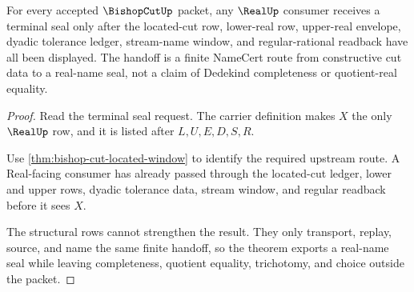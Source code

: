 \begin{theorem}
\label{thm:bishop-cut-real-handoff}
For every accepted $\BishopCutUp$ packet, any $\RealUp$ consumer receives a terminal seal only after the located-cut row, lower-real row, upper-real envelope, dyadic tolerance ledger, stream-name window, and regular-rational readback have all been displayed. The handoff is a finite NameCert route from constructive cut data to a real-name seal, not a claim of Dedekind completeness or quotient-real equality.
\end{theorem}
\begin{proof}
Read the terminal seal request. The carrier definition makes $X$ the only $\RealUp$ row, and it is listed after $L,U,E,D,S,R$.

Use \autoref{thm:bishop-cut-located-window} to identify the required upstream route. A Real-facing consumer has already passed through the located-cut ledger, lower and upper rows, dyadic tolerance data, stream window, and regular readback before it sees $X$.

The structural rows cannot strengthen the result. They only transport, replay, source, and name the same finite handoff, so the theorem exports a real-name seal while leaving completeness, quotient equality, trichotomy, and choice outside the packet.
\end{proof}

\begin{closurestatus}{\BishopCutUp}
  \theoryclosure{\seedClosure}
  \formalstatus{\formalTargetV}
\end{closurestatus}
